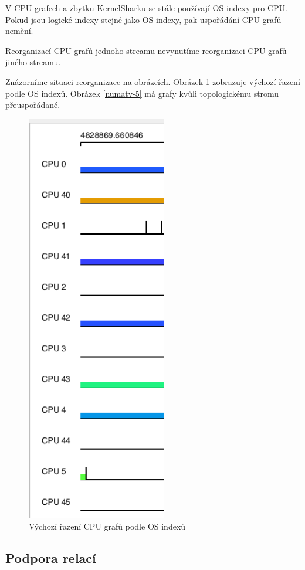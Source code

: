 V CPU grafech a zbytku KernelSharku se stále používají OS indexy pro CPU. Pokud jsou logické indexy stejné jako OS indexy, pak uspořádání CPU grafů nemění.

Reorganizací CPU grafů jednoho streamu nevynutíme reorganizaci CPU grafů jiného streamu.

Znázorníme situaci reorganizace na obrázcích. Obrázek \ref{numatv-4} zobrazuje výchozí řazení podle OS indexů. Obrázek \ref{numatv-5} má grafy kvůli topologickému stromu přeuspořádané.

\begin{figure}[p]\centering
    \includegraphics[height=180mm]{img/NUMATV/numatv-4}
    \caption{Výchozí řazení CPU grafů podle OS indexů}
    \label{numatv-4}
\end{figure}

\subsection{Podpora relací}

